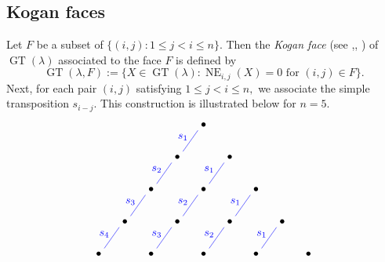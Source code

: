 \documentclass[11pt,reqno]{amsart}
\DeclareMathOperator{\GT}{GT}
\DeclareMathOperator{\NE}{NE}
\begin{document}
\subsection{Kogan faces}
\label{sec:Kogan}
Let $F$ be a subset of $\{(i,j): 1 \leq j < i \leq n \}$. Then the {\em Kogan face} (see \cite[\S2.2.1]{Kogan},\cite[\S3.3 \& \S4.3]{Fujita:2}, \cite[\S5]{Fujita}) of $\GT(\lambda)$ associated to the face $F$ is defined by
$$\GT(\lambda,F):=\{X \in \GT(\lambda): \NE_{i,j}(X)=0 \text{ for } (i,j) \in F \}.$$
Next, for each pair $(i,j)$ satisfying $1 \leq j < i \leq n,$ we associate the simple transposition $s_{i-j}$. This construction is illustrated below for $n=5$.
$$ 
\begin{tikzpicture}[scale=1.2]
    \draw (2.8,2*1.732) node {$\bullet$};
	\draw (2.1,1.5*1.732) node {$\bullet$};
    \draw (3.5,1.5*1.732) node {$\bullet$};
	\draw (1.4,1.732) node {$\bullet$};
	\draw (2.8,1.732) node {$\bullet$};
    \draw (4.2,1.732) node {$\bullet$};
	\draw (0.7,0.5*1.732) node {$\bullet$};
	\draw (2.1,0.5*1.732) node {$\bullet$};
	\draw (3.5,0.5*1.732) node {$\bullet$};
    \draw (4.9,0.5*1.732) node {$\bullet$};
	\draw (0,0) node {$\bullet$};
	\draw (1.4,0) node {$\bullet$};
	\draw (2.8,0) node {$\bullet$};
	\draw (4.2,0) node {$\bullet$};
    \draw (5.6,0) node {$\bullet$};
    \draw[blue] (0.15,0.15) -- (0.7-0.15,0.5*1.732-0.15);
    \draw[blue] (0.7+0.15,0.5*1.732+0.15) -- (1.4-0.15,1.732-0.15);
    \draw[blue] (1.4+0.15,1.732+0.15) -- (2.1-0.15,1.5*1.732-0.15);
    \draw[blue] (2.1+0.15,1.5*1.732+0.15) -- (2.8-0.15,2*1.732-0.15);
    \draw[blue] (1.4+0.15,0+0.15) -- (2.1-0.15,0.5*1.732-0.15);
    \draw[blue] (2.1+0.15,0.5*1.732+0.15) -- (2.8-0.15,1.732-0.15);
    \draw[blue] (2.8+0.15,1.732+0.15)--(3.5-0.15,1.5*1.732-0.15);
    \draw[blue] (2.8+0.15,0+0.15) -- (3.5-0.15,0.5*1.732-0.15);
    \draw[blue] (3.5+0.15,0.5*1.732+0.15) -- (4.2-0.15,1.732-0.15);
    \draw[blue] (4.2+0.15,0+0.15)--(4.9-0.15,0.5*1.732-0.15);
    \draw[blue] (0.7/2-0.2,0.5*1.732/2+0.1) node {$s_4$};
    \draw[blue] (3.5/2-0.2,1.732/4+0.1) node {$s_3$};
    \draw[blue] (6.3/2-0.2,1.732/4+0.1) node {$s_2$};
    \draw[blue] (9.1/2-0.2,1.732/4+0.1) node {$s_1$};
    \draw[blue] (2.1/2-0.2,0.75*1.732+0.1) node {$s_3$};
    \draw[blue] (2.1/2-0.2+1.4,0.75*1.732+0.1) node {$s_2$};
    \draw[blue] (2.1/2-0.2+2.8,0.75*1.732+0.1) node {$s_1$};
    \draw[blue] (3.5/2-0.2,2.5*1.732/2+0.1) node {$s_2$};
    \draw[blue] (3.5/2-0.2 +1.4,2.5*1.732/2+0.1) node {$s_1$};
    \draw[blue] (4.9/2-0.2,1.75*1.732+0.1) node {$s_1$};
\end{tikzpicture}
$$
\end{document}
